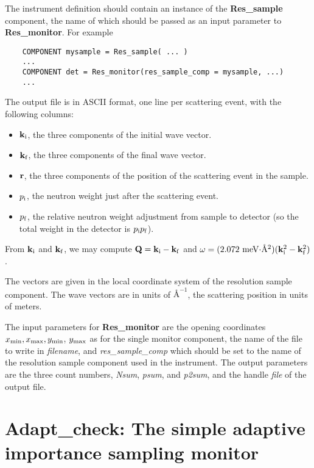 The instrument definition should contain an instance of the
\textbf{Res\_sample} component, the name of which should be passed as an
input parameter to \textbf{Res\_monitor}. For example
\begin{verbatim}
    COMPONENT mysample = Res_sample( ... )
    ...
    COMPONENT det = Res_monitor(res_sample_comp = mysample, ...)
    ...
\end{verbatim}

The output file is in ASCII format, one line per scattering event, with
the following columns:
\begin{itemize}
\item ${\bf k}_{\rm i}$, the three components of the initial wave vector.
\item ${\bf k}_{\rm f}$, the three components of the final wave vector.
\item ${\bf r}$, the three components of the position of the scattering
  event in the sample.
\item $p_{\rm i}$, the neutron weight just after the scattering event.
\item $p_{\rm f}$, the relative neutron weight adjustment from sample to
  detector (so the total weight in the detector is $p_{\rm i}p_{\rm f}$).
\end{itemize}
From ${\bf k}_{\rm i}$ and ${\bf k}_{\rm f}$, we may compute ${\bf Q} =
{\bf k}_{\rm i} - {\bf k}_{\rm f}$ and $\omega = (\mbox{2.072
  meV$\cdot$\AA$^2$})({\bf k}_{\rm i}^2 - {\bf k}_{\rm f}^2)$.

The vectors are given in the local coordinate system of the resolution
sample component. The wave vectors are in units of $\mbox{\AA}^{-1}$, the
scattering position in units of meters.

The input parameters for {\bf Res\_monitor} are the opening coordinates
$x_{\rm min}, x_{\rm max}, y_{\rm min}$, $y_{\rm max}$ as for the single
monitor component, the name of the file to write in \textit{filename},
and \textit{res\_sample\_comp} which should be set to the name of the
resolution sample component used in the instrument.  The output
parameters are the three count numbers, \textit{Nsum}, \textit{psum},
and \textit{p2sum}, and the handle \textit{file} of the output file.

\section{Adapt\_check: The simple adaptive importance sampling monitor}
\label{s:adapt_check}

